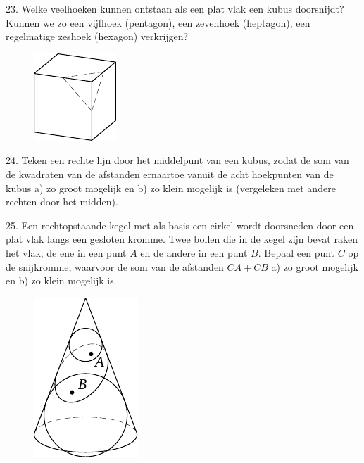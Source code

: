 \begin{problem}{23.}
	Welke veelhoeken kunnen ontstaan als een plat vlak een kubus doorsnijdt? Kunnen we zo een vijfhoek (pentagon), een zevenhoek (heptagon), een regelmatige zeshoek (hexagon) verkrijgen?
	\begin{figure}
		\includegraphics{resources/taskbook-7}
	\end{figure}
\end{problem}

\begin{problem}{24.}
	Teken een rechte lijn door het middelpunt van een kubus, zodat de som van de kwadraten van de afstanden ernaartoe vanuit de acht hoekpunten van de kubus a) zo groot mogelijk en b) zo klein mogelijk is (vergeleken met andere rechten door het midden).
\end{problem}

\clearpage

\begin{problem}{25.}
	Een rechtopstaande kegel met als basis een cirkel wordt doorsne\-den door een plat vlak langs een gesloten kromme. Twee bollen die in de kegel zijn bevat raken het vlak, de ene in een punt $A$ en de andere in een punt $B$. Bepaal een punt $C$ op de snijkromme, waarvoor de som van de afstanden $CA + CB$ a) zo groot mogelijk en b) zo klein mogelijk is.
	\begin{figure}
		\includegraphics{resources/taskbook-9}
	\end{figure}
\end{problem}

